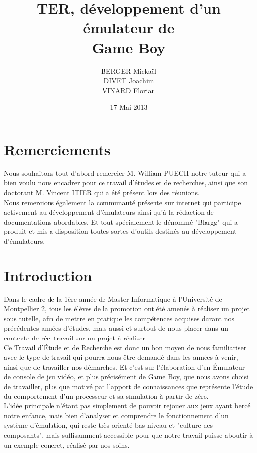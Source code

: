 \documentclass[french]{report}
\title{TER, développement d'un émulateur de \\Game Boy}
\author{BERGER Mickaël \\ DIVET Joachim \\ VINARD Florian}
\date{17 Mai 2013}
\begin{document}
\maketitle
\chapter*{Remerciements}
Nous souhaitons tout d'abord remercier M. William PUECH notre tuteur qui a bien voulu nous encadrer pour ce travail d'études et de recherches, ainsi que son doctorant M. Vincent ITIER qui a été présent lors des réunions. \\Nous remercions également la communauté présente sur internet qui participe activement au développement d'émulateurs ainsi qu'à la rédaction de documentations abordables. Et tout spécialement le dénommé "Blargg" qui a produit et mis à disposition toutes sortes d'outils destinés au développement d'émulateurs.

\tableofcontents
\listoffigures

\chapter*{Introduction}
	Dans le cadre de la 1ère année de Master Informatique à l'Université de Montpellier
	2, tous les élèves de la promotion ont été amenés à réaliser un projet
	sous tutelle, afin de mettre en pratique les compétences acquises
	durant nos précédentes années d'études, mais aussi et surtout de nous
	placer dans un contexte de réel travail sur un projet à réaliser.\\
	Ce Travail d'Étude et de Recherche est donc un bon moyen de nous
	familiariser avec le type de travail qui pourra nous être demandé dans
	les années à venir, ainsi que de travailler nos démarches.
	Et c'est sur l'élaboration d'un Émulateur de console de jeu vidéo, et plus précisément de Game Boy,
	que nous avons choisi de travailler, plus que motivé par l'apport de
	connaissances que représente l'étude du comportement d'un processeur
	et sa simulation à partir de zéro.
	\\
	L'idée principale n'étant pas simplement de pouvoir rejouer aux jeux
	ayant bercé notre enfance, mais bien d'analyser et comprendre le
	fonctionnement d'un système d'émulation, qui reste très orienté bas
	niveau et "culture des composants", mais suffisamment accessible pour
	que notre travail puisse aboutir à un exemple concret, réalisé par nos
	soins.\\
	\\
\end{document}
